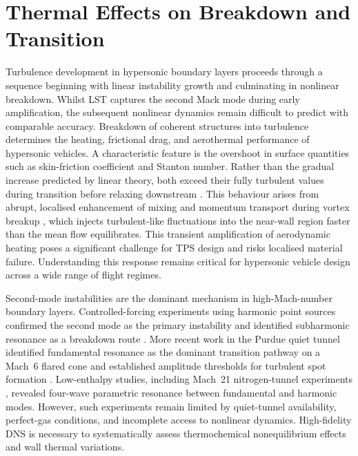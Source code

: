   \chapter{Thermal Effects on Breakdown and Transition}\label{chapter:breakdown}

Turbulence development in hypersonic boundary layers proceeds through a sequence beginning with linear instability growth and culminating in nonlinear breakdown. Whilst \gls{LST} captures the second Mack mode during early amplification, the subsequent nonlinear dynamics remain difficult to predict with comparable accuracy. Breakdown of coherent structures into turbulence determines the heating, frictional drag, and aerothermal performance of hypersonic vehicles. A characteristic feature is the overshoot in surface quantities such as skin-friction coefficient and Stanton number. Rather than the gradual increase predicted by linear theory, both exceed their fully turbulent values during transition before relaxing downstream \citep{Holden1972}. This behaviour arises from abrupt, localised enhancement of mixing and momentum transport during vortex breakup , which injects turbulent-like fluctuations into the near-wall region faster than the mean flow equilibrates. This transient amplification of aerodynamic heating poses a significant challenge for \gls{TPS} design and risks localised material failure. Understanding this response remains critical for hypersonic vehicle design across a wide range of flight regimes.

Second-mode instabilities are the dominant mechanism in high-Mach-number boundary layers. Controlled-forcing experiments using harmonic point sources confirmed the second mode as the primary instability and identified subharmonic resonance as a breakdown route \citep{Shiplyuk2003,Bountin2008}. More recent work in the Purdue quiet tunnel identified fundamental resonance as the dominant transition pathway on a Mach~6 flared cone \citep{Chynoweth2014} and established amplitude thresholds for turbulent spot formation \citep{Casper2011,Casper2012}. Low-enthalpy studies, including Mach~21 nitrogen-tunnel experiments \citep{Mironov2000}, revealed four-wave parametric resonance between fundamental and harmonic modes. However, such experiments remain limited by quiet-tunnel availability, perfect-gas conditions, and incomplete access to nonlinear dynamics. High-fidelity \gls{DNS} is necessary to systematically assess thermochemical nonequilibrium effects and wall thermal variations.

